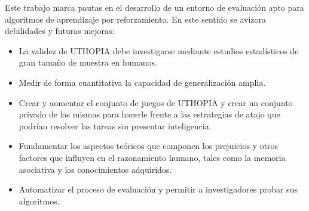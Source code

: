 \begin{recomendations}
    Este trabajo marca pautas en el desarrollo de un entorno de evaluación apto para algoritmos de aprendizaje por reforzamiento. En este sentido se avizora debilidades y futuras mejoras:
    
    \begin{itemize}
    \item La validez de UTHOPIA debe investigarse mediante estudios estadísticos de gran tamaño de muestra en humanos.
    \item Medir de forma cuantitativa la capacidad de generalización amplia.
    \item Crear y aumentar el conjunto de juegos de UTHOPIA y crear un conjunto privado de las mismas para hacerle frente a las estrategias de atajo que podrían resolver las tareas sin presentar inteligencia.
    \item Fundamentar los aspectos teóricos que componen los prejuicios y otros factores que influyen en el razonamiento humano, tales como la memoria asociativa y los conocimientos adquiridos.
    \item Automatizar el proceso de evaluación y permitir a investigadores probar sus algoritmos.
    \end{itemize}
    
\end{recomendations}
    
    